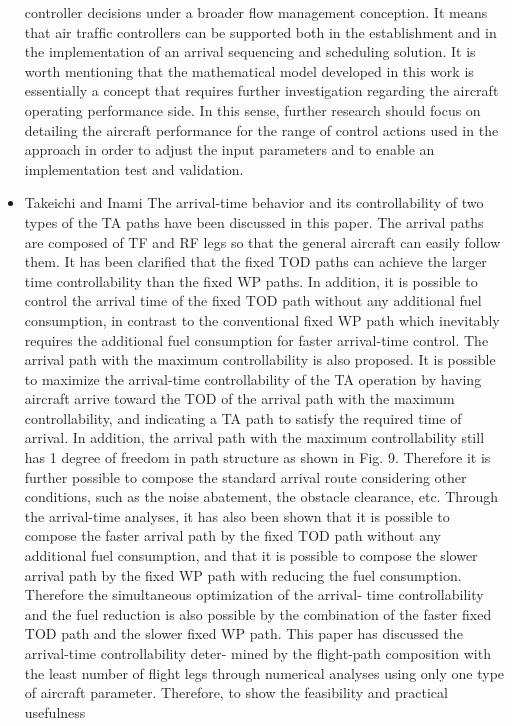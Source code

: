 \documentclass{aer1315-pretty}
\begin{document}
\begin{itemize}
controller decisions under a broader ﬂow management conception. It means that air trafﬁc controllers can be supported both
in the establishment and in the implementation of an arrival sequencing and scheduling solution.
    It is worth mentioning that the mathematical model developed in this work is essentially a concept that requires further
investigation regarding the aircraft operating performance side. In this sense, further research should focus on detailing the
aircraft performance for the range of control actions used in the approach in order to adjust the input parameters and to
enable an implementation test and validation.


\item Takeichi and Inami \cite{Takeichi:2010}
  The arrival-time behavior and its controllability of two types of the
TA paths have been discussed in this paper. The arrival paths are
composed of TF and RF legs so that the general aircraft can easily
follow them. It has been clariﬁed that the ﬁxed TOD paths can
achieve the larger time controllability than the ﬁxed WP paths. In
addition, it is possible to control the arrival time of the ﬁxed TOD
path without any additional fuel consumption, in contrast to the
conventional ﬁxed WP path which inevitably requires the additional
fuel consumption for faster arrival-time control.
   The arrival path with the maximum controllability is also
proposed. It is possible to maximize the arrival-time controllability of
the TA operation by having aircraft arrive toward the TOD of the
arrival path with the maximum controllability, and indicating a TA
path to satisfy the required time of arrival. In addition, the arrival path
with the maximum controllability still has 1 degree of freedom in
path structure as shown in Fig. 9. Therefore it is further possible to
compose the standard arrival route considering other conditions,
such as the noise abatement, the obstacle clearance, etc. Through the
arrival-time analyses, it has also been shown that it is possible to
compose the faster arrival path by the ﬁxed TOD path without any
additional fuel consumption, and that it is possible to compose the
slower arrival path by the ﬁxed WP path with reducing the fuel
consumption. Therefore the simultaneous optimization of the arrival-
time controllability and the fuel reduction is also possible by the
combination of the faster ﬁxed TOD path and the slower ﬁxed WP
path.
   This paper has discussed the arrival-time controllability deter-
mined by the ﬂight-path composition with the least number of ﬂight
legs through numerical analyses using only one type of aircraft
parameter. Therefore, to show the feasibility and practical usefulness



\end{itemize}
\end{document}
